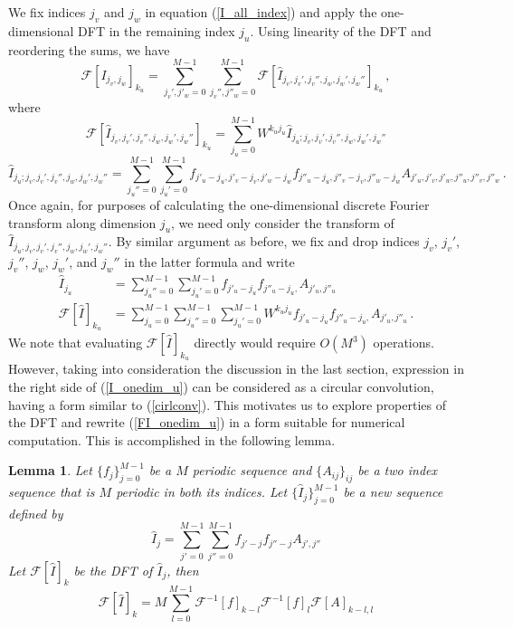 \documentclass[12pt]{CSUNthesis}
\newtheorem{lemma}{Lemma}
\def\calF{\mathcal{F}}
\begin{document}
We fix indices $j_v$ and $j_w$  in equation (\ref{I_all_index}) and apply the one-dimensional DFT in the remaining index $j_u$. Using linearity of the DFT and reordering the sums, we have 
\begin{equation*}
\calF[I_{j_v,j_w}]_{k_u} = \sum_{j_v',j'_w=0}^{M-1} \sum_{j_v'',j''_{w}=0}^{M-1}  \calF[\hat{I}_{j_v,j_v',j_v'',j_w,j_w',j_w''}]_{k_u}\, ,
\end{equation*}
where 
\begin{equation*}
\calF[\hat{I}_{j_v,j_v',j_v'',j_w,j_w',j_w''}]_{k_u} = 
\sum_{j_u=0}^{M-1}  W^{ k_u j_u} \hat{I}_{j_u;j_v,j_v',j_v'',j_w,j_w',j_w''} 
\end{equation*}
\begin{equation*}
\hat{I}_{j_u;j_v,j_v',j_v'',j_w,j_w',j_w''} = \sum_{j_u''=0}^{M-1} \sum_{j_u'=0}^{M-1} f_{j'_{u}-j_{u},j'_{v}-j_{v},j'_{w}-j_{w}} f_{j''_{u}-j_{u},j''_{v}-j_{v},j''_{w}-j_{w}} A_{j'_{u},j'_{v},j'_{w},j''_u,j''_{v},j''_{w}}\, .
\end{equation*}
Once again, for purposes of calculating the one-dimensional discrete Fourier transform along dimension $j_u$, we need only consider the transform of $\hat{I}_{j_u,j_v,j_v',j_v'',j_w,j_w',j_w''}$. 
By similar argument as before, we fix and drop indices $j_v$, $j_v'$, $j_v''$, $j_w$, $j_w'$, and $j_w''$ in the latter formula and write 
\begin{align}
\hat{I}_{j_u} &= \sum_{j_u''=0}^{M-1} \sum_{j_u'=0}^{M-1} f_{j'_{u}-j_{u}} f_{j''_{u}-j_{u},} A_{j'_{u},j''_u} \label{I_onedim_u} \\
\calF[\hat{I}]_{k_u} &= \sum_{j_u=0}^{M-1} \sum_{j_u''=0}^{M-1} \sum_{j_u'=0}^{M-1} W^{k_u j_u} f_{j'_{u}-j_{u}} f_{j''_{u}-j_{u},} A_{j'_{u},j''_u}\, . \label{FI_onedim_u}
\end{align}
We note that evaluating $\calF[\hat{I}]_{k_u}$ directly would require $O(M^3)$ operations.
However, taking into consideration the discussion in the last section, expression in the right side of (\ref{I_onedim_u}) can be considered as a circular convolution, having a form similar to (\ref{cirlconv}). This motivates us to explore properties of the DFT and rewrite (\ref{FI_onedim_u}) in a form suitable for numerical computation. This is accomplished in the following lemma.

\begin{lemma}
\label{lemma_dft}
Let $\{ f_j\}_{j=0}^{M-1}$ be a $M$ periodic sequence and $\{A_{ij}\}_{ij}$ be a two index sequence that is $M$ periodic in both its indices. Let $\{\hat{I}_j\}_{j=0}^{M-1}$ be a new sequence defined by 
\begin{equation}
\label{I_onedim}
\hat{I}_{j} =  \sum_{j'=0}^{M-1} \sum_{j''=0}^{M-1} f_{j'-j}f_{j''-j} A_{j',j''} 
\end{equation}
Let $\calF[\hat{I}]_k$ be the DFT of $\hat{I}_j$, then  
\begin{equation}
\label{onedfconv}
\calF[\hat{I}]_k = M \sum_{l=0}^{M-1} \calF^{-1}[f]_{k-l} \calF^{-1}[f]_{l} \calF[A]_{k-l,l}
\end{equation}
\end{lemma}
\end{document}
